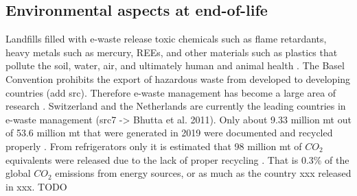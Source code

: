 \subsection{Environmental aspects at end-of-life}

Landfills filled with e-waste release toxic chemicals such as flame retardants, heavy metals such as mercury, REEs, and other materials such as plastics that pollute the soil, water, air, and ultimately human and animal health \cite{javed2024}. The Basel Convention prohibits the export of hazardous waste from developed to developing countries (add src). Therefore e-waste management has become a large area of research \cite{javed2024}. Switzerland and the Netherlands are currently the leading countries in e-waste management (src7 -> Bhutta et al. 2011).
Only about 9.33 million mt out of 53.6 million mt that were generated in 2019 were documented and recycled properly \cite{javed2024}. From refrigerators only it is estimated that 98 million mt of $CO_2$ equivalents were released due to the lack of proper recycling \cite{javed2024}. That is 0.3\% of the global $CO_2$ emissions from energy sources, or as much as the country xxx released in xxx. TODO

